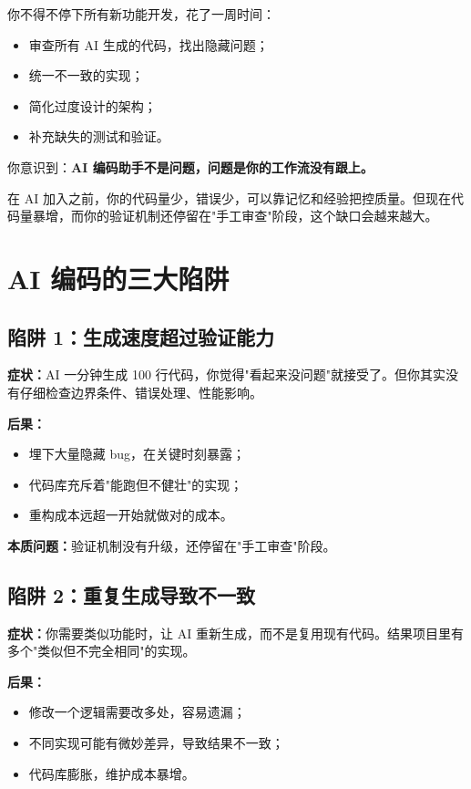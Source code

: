 你不得不停下所有新功能开发，花了一周时间：
\begin{itemize}
  \item 审查所有 AI 生成的代码，找出隐藏问题；
  \item 统一不一致的实现；
  \item 简化过度设计的架构；
  \item 补充缺失的测试和验证。
\end{itemize}

你意识到：\textbf{AI 编码助手不是问题，问题是你的工作流没有跟上。}

在 AI 加入之前，你的代码量少，错误少，可以靠记忆和经验把控质量。但现在代码量暴增，而你的验证机制还停留在"手工审查"阶段，这个缺口会越来越大。

\section{AI 编码的三大陷阱}

\subsection{陷阱 1：生成速度超过验证能力}

\textbf{症状：}AI 一分钟生成 100 行代码，你觉得"看起来没问题"就接受了。但你其实没有仔细检查边界条件、错误处理、性能影响。

\textbf{后果：}
\begin{itemize}
  \item 埋下大量隐藏 bug，在关键时刻暴露；
  \item 代码库充斥着"能跑但不健壮"的实现；
  \item 重构成本远超一开始就做对的成本。
\end{itemize}

\textbf{本质问题：}验证机制没有升级，还停留在"手工审查"阶段。

\subsection{陷阱 2：重复生成导致不一致}

\textbf{症状：}你需要类似功能时，让 AI 重新生成，而不是复用现有代码。结果项目里有多个"类似但不完全相同"的实现。

\textbf{后果：}
\begin{itemize}
  \item 修改一个逻辑需要改多处，容易遗漏；
  \item 不同实现可能有微妙差异，导致结果不一致；
  \item 代码库膨胀，维护成本暴增。
\end{itemize}

